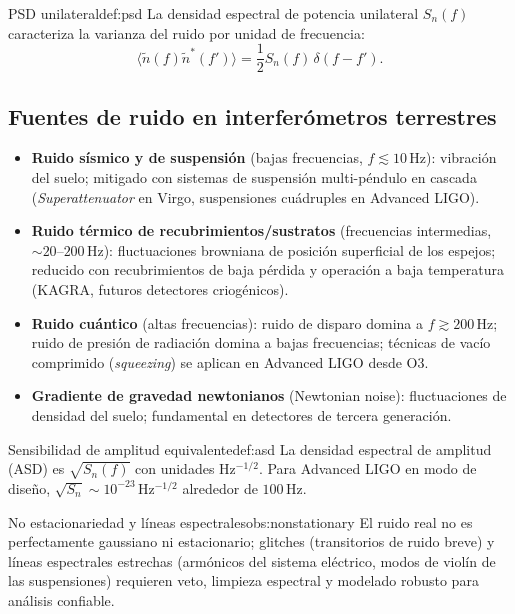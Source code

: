 \begin{definicion}{PSD unilateral}{def:psd}
La densidad espectral de potencia unilateral $S_n(f)$ caracteriza la varianza del ruido por unidad de frecuencia:
\begin{equation}
\langle \tilde n(f)\tilde n^\ast(f')\rangle=
\frac{1}{2}S_n(f)\,\delta(f-f').
\end{equation}
\end{definicion}

\subsection{Fuentes de ruido en interferómetros terrestres}

\begin{itemize}[leftmargin=2em]
  \item \textbf{Ruido sísmico y de suspensión} (bajas frecuencias, $f\lesssim 10\,\mathrm{Hz}$): vibración del suelo; mitigado con sistemas de suspensión multi-péndulo en cascada (\emph{Superattenuator} en Virgo, suspensiones cuádruples en Advanced LIGO).
  \item \textbf{Ruido térmico de recubrimientos/sustratos} (frecuencias intermedias, $\sim 20\text{--}200\,\mathrm{Hz}$): fluctuaciones browniana de posición superficial de los espejos; reducido con recubrimientos de baja pérdida y operación a baja temperatura (KAGRA, futuros detectores criogénicos).
  \item \textbf{Ruido cuántico} (altas frecuencias): ruido de disparo domina a $f\gtrsim 200\,\mathrm{Hz}$; ruido de presión de radiación domina a bajas frecuencias; técnicas de vacío comprimido (\emph{squeezing}) se aplican en Advanced LIGO desde O3.
  \item \textbf{Gradiente de gravedad newtonianos} (Newtonian noise): fluctuaciones de densidad del suelo; fundamental en detectores de tercera generación.
\end{itemize}

\begin{definicion}{Sensibilidad de amplitud equivalente}{def:asd}
La densidad espectral de amplitud (ASD) es $\sqrt{S_n(f)}$ con unidades $\mathrm{Hz^{-1/2}}$. Para Advanced LIGO en modo de diseño, $\sqrt{S_n}\sim 10^{-23}\,\mathrm{Hz^{-1/2}}$ alrededor de $100\,\mathrm{Hz}$.
\end{definicion}

\begin{observacion}{No estacionariedad y líneas espectrales}{obs:nonstationary}
El ruido real no es perfectamente gaussiano ni estacionario; glitches (transitorios de ruido breve) y líneas espectrales estrechas (armónicos del sistema eléctrico, modos de violín de las suspensiones) requieren veto, limpieza espectral y modelado robusto para análisis confiable.
\end{observacion}

